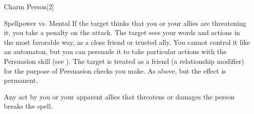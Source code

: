 \begin{spellsection}{Charm Person}[2]
    \begin{spellheader}
    \end{spellheader}
    \begin{spellcontent}
        \begin{spelltargetinginfo}
        \end{spelltargetinginfo}
        \begin{spelleffects}
            \begin{spellattack}{Spellpower vs. Mental}
                \spellspecial If the target thinks that you or your allies are threatening it, you take a  penalty on the attack.
                \spellsuccess The target sees your words and actions in the most favorable way, as a close friend or trusted ally. You cannot control it like an automaton, but you can persuade it to take particular actions with the Persuasion skill (see ). The target is treated as a friend (a  relationship modifier) for the purpose of Persuasion checks you make.
                \spellcritical As above, but the effect is permanent.
            \end{spellattack}
            \spelldur \durlong
        \end{spelleffects}
    \end{spellcontent}
    \begin{spellfooter}
        \spellnotes Any act by you or your apparent allies that threatens or damages the  person breaks the spell.

        \subtlespellnotes

        \norepeatspellnotes
        \miscastrandom
    \end{spellfooter}
\end{spellsection}

